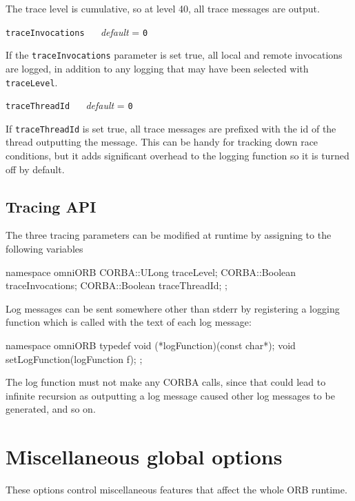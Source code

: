 \documentclass[11pt,twoside,a4paper]{book}
\makeatletter
\newcommand{\code}[1]{\texttt{#1}}
\newcommand{\confopt}[2]
  {\vspace{\baselineskip}\par\noindent\code{#1} ~~ \textit{default} =
   \code{#2}\\[-1ex]\@afterheading}
\makeatother
\begin{document}
\vspace{\baselineskip}

\noindent The trace level is cumulative, so at level 40, all trace
messages are output.


\confopt{traceInvocations}{0}

If the \code{traceInvocations} parameter is set true, all local and
remote invocations are logged, in addition to any logging that may
have been selected with \code{traceLevel}.


\confopt{traceThreadId}{0}

If \code{traceThreadId} is set true, all trace messages are prefixed
with the id of the thread outputting the message. This can be handy
for tracking down race conditions, but it adds significant overhead to
the logging function so it is turned off by default.


\subsection{Tracing API}

The three tracing parameters can be modified at runtime by assigning
to the following variables

\begin{cxxlisting}
namespace omniORB {
  CORBA::ULong   traceLevel;
  CORBA::Boolean traceInvocations;
  CORBA::Boolean traceThreadId;
};
\end{cxxlisting}

\noindent
Log messages can be sent somewhere other than stderr by registering a
logging function which is called with the text of each log message:

\begin{cxxlisting}
namespace omniORB {
  typedef void (*logFunction)(const char*);
  void setLogFunction(logFunction f);
};
\end{cxxlisting}

\noindent
The log function must not make any CORBA calls, since that could lead
to infinite recursion as outputting a log message caused other log
messages to be generated, and so on.




\section{Miscellaneous global options}

These options control miscellaneous features that affect the whole ORB
runtime.
\end{document}
